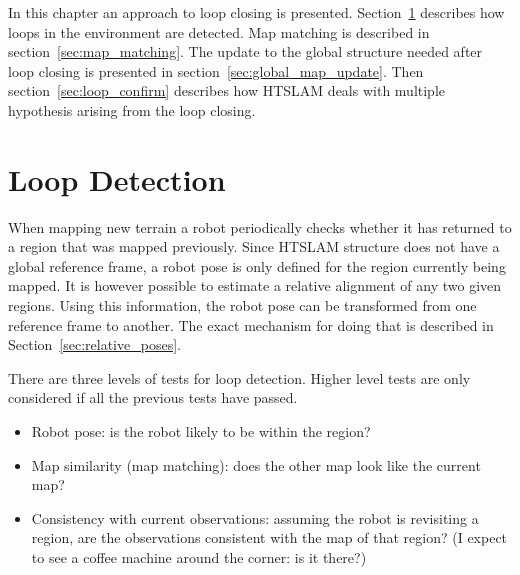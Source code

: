 In this chapter an approach to loop closing is presented.
Section~\ref{sec:loop_detection} describes how loops in the
environment are detected. Map matching is described in
section~\ref{sec:map_matching}. The update to the global structure
needed after loop closing is presented in
section~\ref{sec:global_map_update}. Then
section~\ref{sec:loop_confirm} describes how HTSLAM deals with
multiple hypothesis arising from the loop closing.


\section{Loop Detection}
\label{sec:loop_detection}



When mapping new terrain a robot periodically checks whether it has
returned to a region that was mapped previously. Since HTSLAM
structure does not have a global reference frame, a robot pose is only
defined for the region currently being mapped. It is however possible
to estimate a relative alignment of any two given regions. Using this
information, the robot pose can be transformed from one reference frame
to another. The exact mechanism for doing that is described in
Section~\ref{sec:relative_poses}.

There are three levels of tests for loop detection. Higher level tests
are only considered if all the previous tests have passed.

\begin{itemize}
\item Robot pose: is the robot likely to be within the region?
\item Map similarity (map matching): does the other map look like
the current map?
\item Consistency with current observations: assuming the robot is
  revisiting a region, are the observations consistent with the map of
  that region? (I expect to see a coffee machine around the corner: is
  it there?)
\end{itemize}

